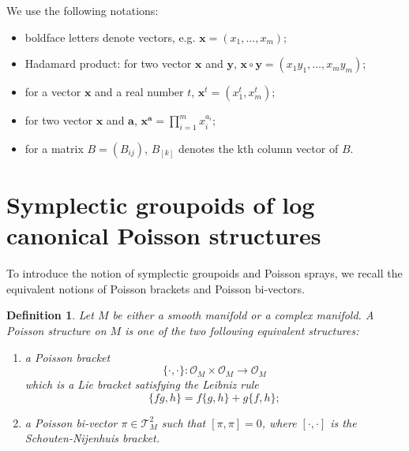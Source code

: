 \documentclass{amsart}
\newtheorem{definition}[theorem]{Definition}
\numberwithin{equation}{section}
\newcommand{\bfa}{\mathbf{a}}
\newcommand{\bfx}{\mathbf{x}}
\newcommand{\bfy}{\mathbf{y}}
\newcommand{\cA}{\mathcal{A}}
\newcommand{\cO}{\mathcal{O}}
\newcommand{\cX}{\mathcal{X}}
\newcommand{\cT}{\mathcal{T}}
\begin{document}
\bigskip


We use the following notations:
\begin{itemize}
	\item boldface letters denote vectors, e.g. $\bfx = (x_1, \ldots, x_m)$;
	\item Hadamard product: for two vector $\bfx$ and $\bfy$, $\bfx \circ \bfy = (x_1y_1, \ldots, x_my_m)$;
	\item for a vector $\bfx$ and a real number $t$, $\bfx^t = (x_1^t, x_m^t)$;
	\item for two vector $\bfx$ and $\bfa$, $\bfx^\bfa = \prod_{i=1}^m x_i^{a_i}$;
	\item for a matrix $B = (B_{ij})$, $B_{[k]}$ denotes the kth column vector of $B$.
\end{itemize}


\section{Symplectic groupoids of log canonical Poisson structures} \label{sec: local}


To introduce the notion of symplectic groupoids and Poisson sprays, we recall the equivalent notions of Poisson brackets and Poisson bi-vectors.
\begin{definition}
  Let $M$ be either a smooth manifold or a complex manifold.
  A \emph{Poisson structure} on $M$ is one of the two following equivalent structures:
  \begin{enumerate}
    \item a \emph{Poisson bracket}
      $$\{\cdot, \cdot\}: \cO_M \times \cO_M \to \cO_M$$
      which is a Lie bracket satisfying the Leibniz rule
      $$\{fg, h\} = f\{g,h\} + g\{f,h\};$$
    \item a \emph{Poisson bi-vector} $\pi \in \cT^2_M$ such that $[\pi, \pi] = 0$, where $[\cdot, \cdot]$ is the Schouten-Nijenhuis bracket.
  \end{enumerate}	
\end{definition}
\end{document}
